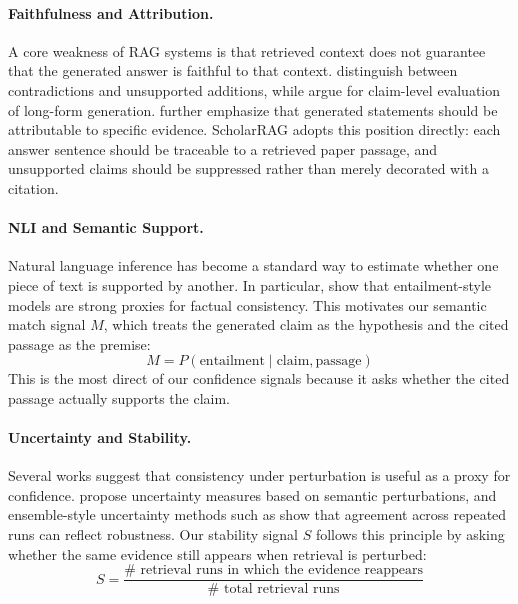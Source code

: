 \documentclass[10pt]{article}
\begin{document}
\paragraph{Faithfulness and Attribution.}
A core weakness of RAG systems is that retrieved context does not
guarantee that the generated answer is faithful to that context.
\citet{maynez2020faithfulness} distinguish between contradictions and
unsupported additions, while \citet{min2023factscore} argue for
claim-level evaluation of long-form generation. \citet{rashkin2023attribution}
further emphasize that generated statements should be attributable to
specific evidence. ScholarRAG adopts this position directly: each
answer sentence should be traceable to a retrieved paper passage, and
unsupported claims should be suppressed rather than merely decorated
with a citation.

\paragraph{NLI and Semantic Support.}
Natural language inference has become a standard way to estimate
whether one piece of text is supported by another. In particular,
\citet{honovich2022true} show that entailment-style models are strong
proxies for factual consistency. This motivates our semantic match
signal $M$, which treats the generated claim as the hypothesis and the
cited passage as the premise:
\begin{equation}
M = P(\text{entailment} \mid \text{claim}, \text{passage})
\end{equation}
This is the most direct of our confidence signals because it asks
whether the cited passage actually supports the claim.

\paragraph{Uncertainty and Stability.}
Several works suggest that consistency under perturbation is useful as
a proxy for confidence. \citet{kuhn2023semantic} propose uncertainty
measures based on semantic perturbations, and ensemble-style
uncertainty methods such as \citet{lakshminarayanan2017simple} show
that agreement across repeated runs can reflect robustness. Our
stability signal $S$ follows this principle by asking whether the same
evidence still appears when retrieval is perturbed:
\begin{equation}
S = \frac{\# \text{ retrieval runs in which the evidence reappears}}
         {\# \text{ total retrieval runs}}
\end{equation}
\end{document}
